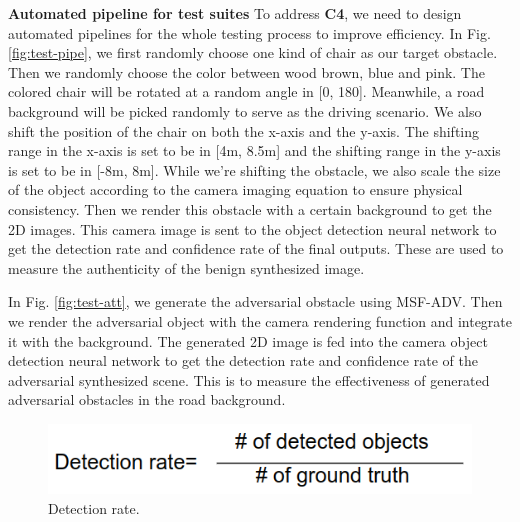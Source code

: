 \textbf{Automated pipeline for test suites} 
To address \textbf{C4}, we need to design automated pipelines for the whole testing process to improve efficiency.
In Fig. \ref{fig:test-pipe}, we first randomly choose one kind of chair as our target obstacle.
Then we randomly choose the color between wood brown, blue and pink.
The colored chair will be rotated at a random angle in [0\textdegree, 180\textdegree].
Meanwhile, a road background will be picked randomly to serve as the driving scenario.
We also shift the position of the chair on both the x-axis and the y-axis.
The shifting range in the x-axis is set to be in [4m, 8.5m] and the shifting range in the y-axis is set to be in [-8m, 8m].
While we're shifting the obstacle, we also scale the size of the object according to the camera imaging equation to ensure physical consistency.
Then we render this obstacle with a certain background to get the 2D images.
This camera image is sent to the object detection neural network to get the detection rate and confidence rate of the final outputs.
These are used to measure the authenticity of the benign synthesized image.

In Fig. \ref{fig:test-att}, we generate the adversarial obstacle using MSF-ADV\cite{msf-adv}.
Then we render the adversarial object with the camera rendering function and integrate it with the background. 
The generated 2D image is fed into the camera object detection neural network to get the detection rate and confidence rate of the adversarial synthesized scene.
This is to measure the effectiveness of generated adversarial obstacles in the road background.



\begin{figure}
	\centering
	\includegraphics[width=0.7\linewidth]{figure/detection.png}
	\caption{Detection rate.}
	\label{fig:detection}
\end{figure}

